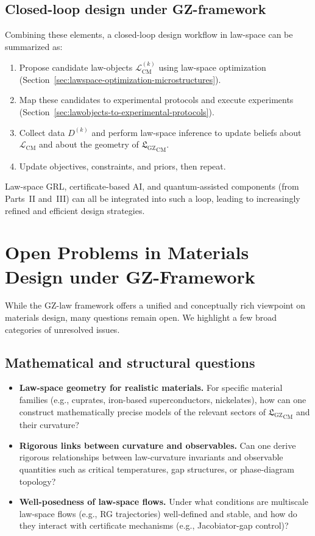 \documentclass[11pt]{book}
\newcommand{\GZLS}{\ensuremath{\mathfrak{L}_{\mathrm{GZ}}}}
\theoremstyle{plain}
\theoremstyle{definition}
\theoremstyle{remark}
\begin{document}
\subsection*{Closed-loop design under GZ-framework}

Combining these elements, a closed-loop design workflow in law-space
can be summarized as:
\begin{enumerate}
  \item Propose candidate law-objects
        $\mathcal{L}_{\mathrm{CM}}^{(k)}$ using law-space
        optimization (Section~\ref{sec:lawspace-optimization-microstructures}).
  \item Map these candidates to experimental protocols and execute
        experiments (Section~\ref{sec:lawobjects-to-experimental-protocols}).
  \item Collect data $D^{(k)}$ and perform law-space inference to
        update beliefs about $\mathcal{L}_{\mathrm{CM}}$ and about
        the geometry of ${\GZLS}_{\mathrm{CM}}$.
  \item Update objectives, constraints, and priors, then repeat.
\end{enumerate}

Law-space GRL, certificate-based AI, and quantum-assisted components
(from Parts~II and~III) can all be integrated into such a loop,
leading to increasingly refined and efficient design strategies.

\section{Open Problems in Materials Design under GZ-Framework}
\label{sec:open-problems-materials-gz}


While the GZ-law framework offers a unified and conceptually rich
viewpoint on materials design, many questions remain open. We
highlight a few broad categories of unresolved issues.

\subsection*{Mathematical and structural questions}

\begin{itemize}
  \item \textbf{Law-space geometry for realistic materials.}
        For specific material families (e.g., cuprates, iron-based
        superconductors, nickelates), how can one construct
        mathematically precise models of the relevant sectors of
        ${\GZLS}_{\mathrm{CM}}$ and their curvature?
  \item \textbf{Rigorous links between curvature and observables.}
        Can one derive rigorous relationships between law-curvature
        invariants and observable quantities such as critical
        temperatures, gap structures, or phase-diagram topology?
  \item \textbf{Well-posedness of law-space flows.}
        Under what conditions are multiscale law-space flows (e.g.,
        RG trajectories) well-defined and stable, and how do they
        interact with certificate mechanisms (e.g., Jacobiator-gap
        control)?
\end{itemize}
\end{document}

